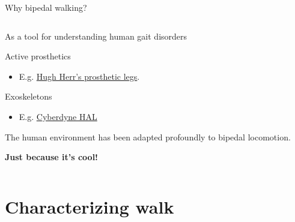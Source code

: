 \documentclass[compress]{beamer}
\newcommand{\source}[2]{{\tiny\it Source: \href{#1}{#2}}}
\begin{document}

\begin{frame}{Why bipedal walking?}

    \begin{columns}
        \begin{column}{0.5\linewidth}
    As a tool for understanding human gait disorders

    Active prosthetics

    \begin{itemize}

        \item E.g.
            \href{https://www.ted.com/talks/hugh_herr_the_new_bionics_that_let_us_run_climb_and_dance?language=en}{Hugh
            Herr's prosthetic legs}.
    \end{itemize}

    Exoskeletons

    \begin{itemize}

        \item E.g. \href{http://www.youtube.com/watch?v=2Ysb-Oko3Bg}{Cyberdyne HAL}
    \end{itemize}

    The human environment has been adapted profoundly to bipedal locomotion.

    \textbf{Just because it's cool!}
            
        \end{column}
        \begin{column}{0.5\linewidth}
            \begin{center}
    
            \end{center}
        \end{column}
    \end{columns}

\end{frame}

\section{Characterizing walk}
\end{document}
